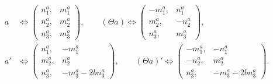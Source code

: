 \begin{equation}
\begin{aligned} 
a &\Leftrightarrow \left(\begin{array}{cc}
n^a_1, &m^a_1 \\ n^a_2, &m^a_2 \\   n^a_3, &m^a_3
\end{array}\right), \qquad
(\Theta a)\Leftrightarrow  \left(\begin{array}{cc}
-m^a_1, &n^a_1 \\ m^a_2, &-n^a_2 \\   n^a_3, &m^a_3
\end{array}\right), \\
a' &\Leftrightarrow  \left(\begin{array}{cc}
n^a_1, &-m^a_1 \\ m^a_2, &n^a_2 \\   n^a_3, &-m^a_3-2bn^a_3
\end{array}\right), \qquad
(\Theta a)'\Leftrightarrow  \left(\begin{array}{cc}
-m^a_1, &-n^a_1 \\ -n^a_2, &m^a_2 \\   n^a_3, &-m^a_3-2bn^a_3
\end{array}\right).
\end{aligned} \nonumber
\end{equation}

